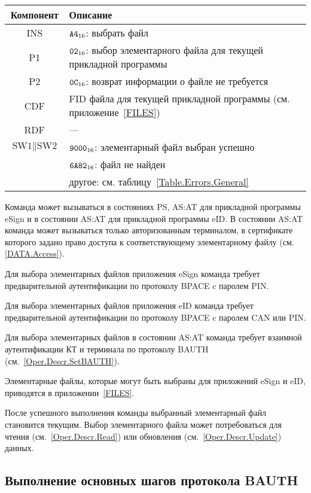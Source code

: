 \begin{table}[hbt]
\caption{}\label{Table.Oper.SelectEFCmd}
\begin{tabular}{|c|p{14cm}|}
\hline
Компонент & Описание \\
\hline
\hline
INS & $\texttt{A4}_{16}$: выбрать файл\\ 
\hline
P1 & $\texttt{02}_{16}$: выбор элементарного файла для текущей прикладной программы\\
\hline
P2 & $\texttt{0C}_{16}$: возврат информации о файле не требуется \\
\hline
CDF & FID файла для текущей прикладной программы (см. приложение~\ref{FILES})\\
\hline 
RDF &  --- \\
\hline
$\text{SW1}\parallel\text{SW2}$ & 
$\texttt{9000}_{16}$: элементарный файл выбран успешно \\
  & $\texttt{6A82}_{16}$: файл не найден \\
  & другое: см. таблицу~\ref{Table.Errors.General}\\
\hline
\end{tabular}
\end{table}

Команда может вызываться в состояниях PS, AS:AT 
для прикладной программы eSign и в состоянии 
AS:AT для прикладной программы eID.
В состоянии AS:AT команда может вызываться только 
авторизованным терминалом, в сертификате которого
задано право доступа к соответствующему элементарному файлу (см. \ref{DATA.Access}).

Для выбора элементарных файлов приложения eSign команда требует 
предварительной аутентификации по протоколу BPACE c 
паролем PIN.

Для выбора элементарных файлов приложения eID команда требует 
предварительной аутентификации по протоколу BPACE c 
паролем CAN или PIN.

Для выбора элементарных файлов в состоянии AS:AT
команда требует взаимной аутентификации КТ и терминала
по протоколу BAUTH (см.~\ref{Oper.Descr.SetBAUTH}).

Элементарные файлы, которые могут быть выбраны 
для приложений eSign и eID, приводятся в приложении~\ref{FILES}. 

После успешного выполнения команды выбранный элементарный файл
становится текущим.
Выбор элементарного файла может потребоваться для
чтения (см.~\ref{Oper.Descr.Read}) или 
обновления (см.~\ref{Oper.Descr.Update}) данных.

\subsection{Выполнение основных шагов протокола BAUTH}
\label{Oper.Descr.GABAUTH} 


